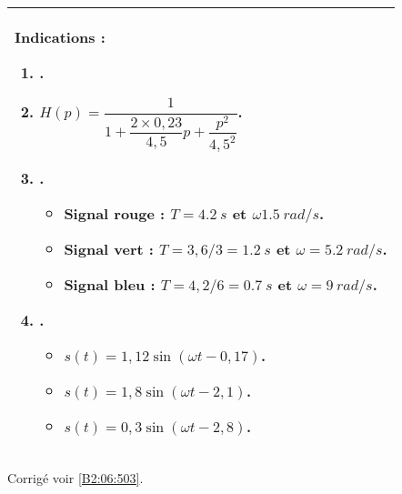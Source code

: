 \ifprof
\else
\footnotesize
\begin{center}
\begin{tabular}{|p{.9\linewidth}|}
\hline
Indications :
\begin{enumerate}
\item .
\item $H(p)=\dfrac{1}{1+\dfrac{2\times 0,23}{4,5}p+\dfrac{p^2}{4,5^2}}$.
\item .
\begin{itemize}
\item Signal rouge : $T=\SI{4,2}{s}$ et $\omega \SI{1,5}{rad/s}$.
\item Signal vert : $T=3,6/3 = \SI{1,2}{s}$ et $\omega= \SI{5,2}{rad/s}$.
\item Signal bleu : $T=4,2/6 = \SI{0,7}{s}$  et $\omega= \SI{9}{rad/s}$.
\end{itemize}
\item .
\begin{itemize}
\item $s(t)=1,12\sin\left(\omega t - 0,17\right)$.
\item $s(t)=1,8\sin\left(\omega t - 2,1\right)$.
\item $s(t)=0,3\sin\left(\omega t - 2,8\right)$.
\end{itemize}
\end{enumerate} \\ \hline
\end{tabular}
\end{center}
\normalsize
\begin{flushright}
\footnotesize{Corrigé  voir \ref{B2:06:503}.}
\end{flushright}%
\fi